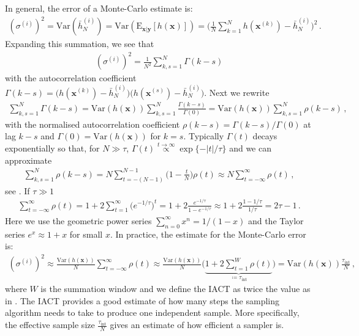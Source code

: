 In general, the error of a Monte-Carlo estimate is:
\begin{align}
	(\sigma^{(i)})^2 = \text{Var}(\bar{h}_N^{(i)}) =  \text{Var}(\text{E}_{\bm{x}|\bm{y}} [h(\bm{x})]) = \Bigg( \frac{1}{N} \sum_{k=1}^{N} h(\bm{x}^{(k)}) - \bar{h}_N^{(i)} \Bigg)^2 \, .
\end{align}
Expanding this summation, we see that
\begin{align}
	(\sigma^{(i)})^2 = \frac{1}{N^2} \sum_{k,s=1}^{N} \Gamma(k-s)
\end{align}
with the autocorrelation coefficient $\Gamma(k-s) =  \big( h(\bm{x}^{(k)}) -\bar{h}_N^{(i)} \big) \big(h(\bm{x}^{(s)}) - \bar{h}_N^{(i)}\big)$.
Next we rewrite
\begin{align}
	\sum_{k,s=1}^{N} \Gamma(k-s) = \text{Var}(h(\bm{x}))  \sum_{k,s=1}^{N} \frac{\Gamma(k-s)}{\Gamma(0)} =  \text{Var}(h(\bm{x})) \sum_{k,s=1}^{N}\rho(k-s)\, ,
\end{align}
with the normalised autocorrelation coefficient $\rho(k-s) =  \Gamma(k-s)/ \Gamma(0)$ at lag $k-s$ and $\Gamma(0) = \text{Var}(h(\bm{x}) )$ for $k=s$.
Typically $\Gamma(t)$ decays exponentially so that, for $N\gg \tau$, $\Gamma(t) \overset{t \rightarrow \infty }{ \propto} \exp\{ - |t| / \tau \}  $ and we can approximate
\begin{align}
	\sum_{k,s=1}^{N}\rho(k-s)  = N \sum_{t = -(N-1) }^{N-1} \Bigg(1- \frac{t}{N} \Bigg) \rho(t)  \approx N  \sum_{t = - \infty }^{\infty} \rho(t) \, ,
\end{align}
see \cite[p. 137]{Sokal1997}.
If $\tau \gg 1$
\begin{align}
	\sum_{t = - \infty }^{\infty} \rho(t) =  1 + 2 \sum_{t = 1}^{\infty} \big(e^{-1/ \tau}\big)^t =  1 + 2 \frac{e^{-1/ \tau} }{1 - e^{-1/ \tau}} \approx  1 + 2 \frac{1 -1/ \tau }{1/ \tau} =  2 \tau -1 \, .%
\end{align}
Here we use the geometric power series $\sum^{\infty}_{n=0} x^n= 1/ (1-x)$ and the Taylor series $ e^x \approx 1+x$ for small $x$.
In practice, the estimate for the Monte-Carlo error is:
\begin{align}
	(\sigma^{(i)})^2   \approx \frac{\text{Var}(h(\bm{x}) )}{N} \sum_{t = - \infty }^{\infty} \rho(t)
	\approx \frac{\text{Var}(h(\bm{x}) )}{N} \Bigg( \underbrace{  1 + 2 \sum_{t = 1}^{W} \rho(t)  }_{ \coloneqq 	\tau_{\text{int}} }\Bigg) = \text{Var}(h(\bm{x})) \frac{ \tau_{\text{int}} }{N}\, ,
\end{align}
where $W$ is the summation window and we define the IACT as twice the value as in \cite[pp. 103-105]{wolff2002LecNot}.
The IACT provides a good estimate of how many steps the sampling algorithm needs to take to produce one independent sample.
More specifically, the effective sample size $\frac{ \tau_{\text{int}} }{N}$ gives an estimate of how efficient a sampler is.

